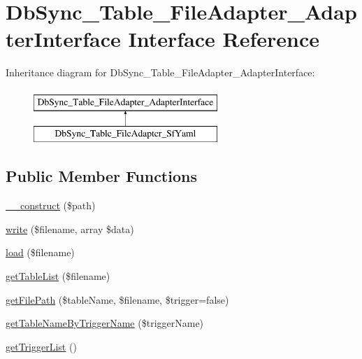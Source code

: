 \hypertarget{interfaceDbSync__Table__FileAdapter__AdapterInterface}{
\section{DbSync\_\-Table\_\-FileAdapter\_\-AdapterInterface Interface Reference}
\label{interfaceDbSync__Table__FileAdapter__AdapterInterface}
}
Inheritance diagram for DbSync\_\-Table\_\-FileAdapter\_\-AdapterInterface:\begin{figure}[H]
\begin{center}
\leavevmode
\includegraphics[height=2.000000cm]{interfaceDbSync__Table__FileAdapter__AdapterInterface}
\end{center}
\end{figure}
\subsection*{Public Member Functions}
\begin{DoxyCompactItemize}
\item 
\hyperlink{interfaceDbSync__Table__FileAdapter__AdapterInterface_ab7e4e51cda7ec7e3f4d6f7a08d46cdf3}{\_\-\_\-construct} (\$path)
\item 
\hyperlink{interfaceDbSync__Table__FileAdapter__AdapterInterface_ab48aede121ece3b8a121f75256059c03}{write} (\$filename, array \$data)
\item 
\hyperlink{interfaceDbSync__Table__FileAdapter__AdapterInterface_ae8fbf40502449c3c2c7b18df254d9b08}{load} (\$filename)
\item 
\hyperlink{interfaceDbSync__Table__FileAdapter__AdapterInterface_a0dc7093d0ae8db622a56829c8a735cb0}{getTableList} (\$filename)
\item 
\hyperlink{interfaceDbSync__Table__FileAdapter__AdapterInterface_a7fce4705be965d6025345bf6021cb261}{getFilePath} (\$tableName, \$filename, \$trigger=false)
\item 
\hyperlink{interfaceDbSync__Table__FileAdapter__AdapterInterface_acba15be587d37701eabbd701a62aa7d1}{getTableNameByTriggerName} (\$triggerName)
\item 
\hyperlink{interfaceDbSync__Table__FileAdapter__AdapterInterface_adad6d6497dfe3be7924cb84b9ff65fc8}{getTriggerList} ()
\end{DoxyCompactItemize}


